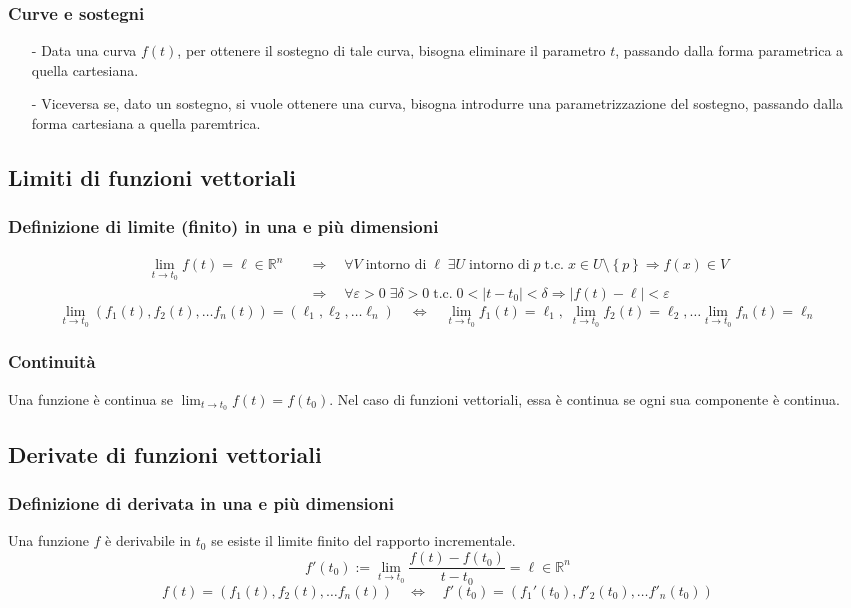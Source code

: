 \documentclass[a4paper]{article}
\newcommand\Rn{\mathbb{R}^n}  %
\newcommand\tc{\text{t.c.}}   %
\begin{document}
\subsubsection*{Curve e sostegni}
\begin{itemize}[topsep=3pt, itemsep=0pt]
	\item[-] Data una curva \(f(t)\), per ottenere il sostegno di tale curva, bisogna eliminare il parametro \(t\), passando dalla
	forma parametrica a quella cartesiana.
	\item[-] Viceversa se, dato un sostegno, si vuole ottenere una curva, bisogna introdurre una parametrizzazione del sostegno,
	passando dalla forma cartesiana a quella paremtrica.
\end{itemize}

\subsection{Limiti di funzioni vettoriali}
\subsubsection*{Definizione di limite (finito) in una e più dimensioni}
\begin{align*}
	\lim_{t \to t_0} f(t) = \ell \in \Rn \quad &\Rightarrow \quad \forall V \; \text{intorno di} \; \ell \; \exists U \; \text{intorno di} \; p \; \tc \; x \in U \setminus \left\{p\right\} \Rightarrow f(x) \in V \\
	&\Rightarrow \quad \forall \varepsilon > 0 \; \exists \delta > 0 \; \tc \; 0 < \left|t-t_0\right| < \delta \Rightarrow \left|f(t) - \ell\right| < \varepsilon
\end{align*}
\[\lim_{t \to t_0} (f_1(t), f_2(t), \dots f_n(t)) = (\ell_1, \ell_2, \dots \ell_n) \quad \Leftrightarrow \quad \lim_{t \to t_0} f_1(t) = \ell_1, \; \lim_{t \to t_0} f_2(t) = \ell_2, \dots \lim_{t \to t_0} f_n(t) = \ell_n\]

\subsubsection*{Continuità}
Una funzione è continua se \(\lim_{t \to t_0} f(t) = f(t_0)\). Nel caso di funzioni vettoriali, essa è continua se ogni sua componente
è continua.

\subsection{Derivate di funzioni vettoriali}
\subsubsection*{Definizione di derivata in una e più dimensioni}
Una funzione \(f\) è derivabile in \(t_0\) se esiste il limite finito del rapporto incrementale.
\[f'(t_0) := \lim_{t \to t_0} \frac{f(t)-f(t_0)}{t-t_0} = \ell \in \Rn\]
\[f(t) = \left(f_1(t), f_2(t), \dots f_n(t) \right) \quad \Leftrightarrow \quad f'(t_0) = \left( f_1'(t_0), f'_2(t_0), \dots f'_n(t_0)\right)\]
\end{document}
